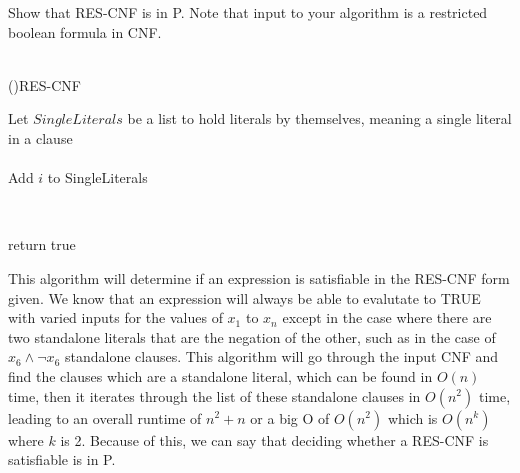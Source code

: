 \documentclass[11pt]{amsart}
\begin{document}
Show that RES-CNF is in P. Note that input to your algorithm is a restricted boolean formula in CNF.\\
\newpage
\hrulefill \\
\begin{algorithm}[H]
    \Fn(){RES-CNF}{
    \SetAlgoLined
    \SetNoFillComment
    \DontPrintSemicolon
        Let $SingleLiterals$ be a list to hold literals by themselves, meaning a single literal in a clause\\
         {
            \\
             {
                Add $i$ to SingleLiterals
            }
        }

         {
             {
                \\
            }
        }

        return true
    }
    \end{algorithm}
\bigskip
This algorithm will determine if an expression is satisfiable in the RES-CNF form given. We know that an expression will always be able to evalutate to TRUE with varied inputs for the values of $x_1$ to $x_n$ except in the case where there are two standalone literals that are the negation of the other, such as in the case of $x_6 \wedge \neg x_6$ standalone clauses. This algorithm will go through the input CNF and find the clauses which are a standalone literal, which can be found in $O(n)$ time, then it iterates through the list of these standalone clauses in $O(n^2)$ time, leading to an overall runtime of $n^2 + n$ or a big O of $O(n^2)$ which is $O(n^k)$ where $k$ is 2. Because of this, we can say that deciding whether a RES-CNF is satisfiable is in P.
\end{document}
